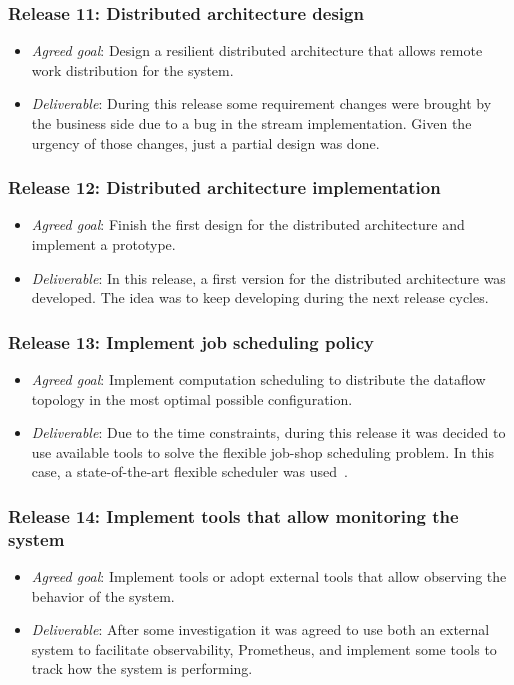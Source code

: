 \subsubsection{Release 11: Distributed architecture design}
\begin{itemize}
\item \textit{Agreed goal}: Design a resilient distributed architecture that
  allows remote work distribution for the system.
\item \textit{Deliverable}: During this release some requirement changes were brought
  by the business side due to a bug in the stream implementation. Given the urgency
  of those changes, just a partial design was done.
\end{itemize}

\subsubsection{Release 12: Distributed architecture implementation}
\begin{itemize}
\item \textit{Agreed goal}: Finish the first design for the distributed
  architecture and implement a prototype.
\item \textit{Deliverable}: In this release, a first version for the distributed
  architecture was developed. The idea was to keep developing during the next
  release cycles.
\end{itemize}

\subsubsection{Release 13: Implement job scheduling policy}
\begin{itemize}
\item \textit{Agreed goal}: Implement computation scheduling to distribute the
  dataflow topology in the most optimal possible configuration.
\item \textit{Deliverable}: Due to the time constraints, during this release it
  was decided to use available tools to solve the flexible job-shop scheduling
  problem. In this case, a state-of-the-art flexible scheduler was used~\cite{firmament}.
\end{itemize}

\subsubsection{Release 14: Implement tools that allow monitoring the system}
\begin{itemize}
\item \textit{Agreed goal}: Implement tools or adopt external tools that allow
  observing the behavior of the system.
\item \textit{Deliverable}: After some investigation it was agreed to use both
  an external system to facilitate observability, Prometheus, and implement some
  tools to track how the system is performing.
\end{itemize}


